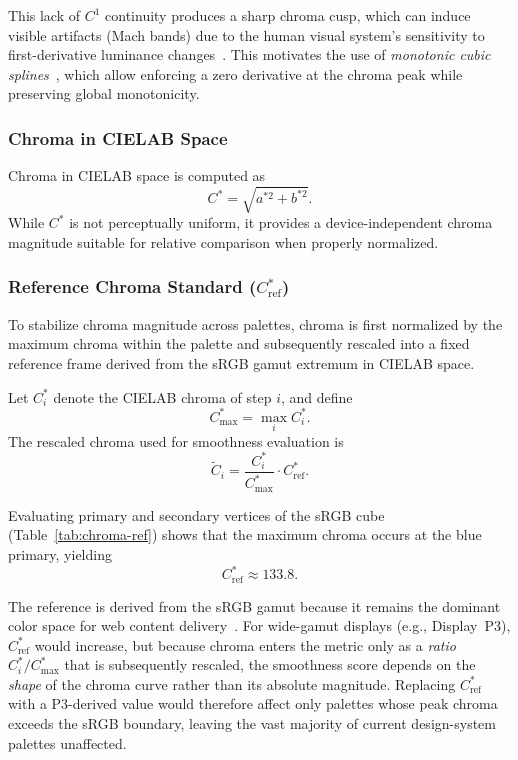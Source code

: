 This lack of $C^1$ continuity produces a sharp chroma cusp, which can induce visible artifacts
(Mach bands) due to the human visual system’s sensitivity to first-derivative luminance changes~\cite{mach1865}.
This motivates the use of \emph{monotonic cubic splines}~\cite{fritsch1980}, which allow enforcing a zero
derivative at the chroma peak while preserving global monotonicity.

\subsubsection{Chroma in CIELAB Space}

Chroma in CIELAB space is computed as
\begin{equation}
C^* = \sqrt{a^{*2} + b^{*2}} .
\end{equation}
While $C^*$ is not perceptually uniform, it provides a device-independent chroma magnitude
suitable for relative comparison when properly normalized.

\subsubsection{Reference Chroma Standard ($C^*_{\mathrm{ref}}$)}

To stabilize chroma magnitude across palettes, chroma is first normalized by the maximum
chroma within the palette and subsequently rescaled into a fixed reference frame derived
from the sRGB gamut extremum in CIELAB space.

Let $C^*_i$ denote the CIELAB chroma of step $i$, and define
\begin{equation}
C^*_{\max} = \max_i C^*_i .
\end{equation}
The rescaled chroma used for smoothness evaluation is
\begin{equation}
\tilde C_i = \frac{C^*_i}{C^*_{\max}} \cdot C^*_{\mathrm{ref}} .
\end{equation}

Evaluating primary and secondary vertices of the sRGB cube (Table~\ref{tab:chroma-ref}) shows that the maximum chroma
occurs at the blue primary, yielding
\begin{equation}
C^*_{\mathrm{ref}} \approx 133.8 .
\end{equation}



\noindent
The reference is derived from the sRGB gamut because it remains the
dominant color space for web content delivery~\cite{srgb}.
For wide-gamut displays (e.g., Display~P3), $C^*_{\mathrm{ref}}$ would
increase, but because chroma enters the metric only as a \emph{ratio}
$C^*_i / C^*_{\max}$ that is subsequently rescaled, the smoothness score
depends on the \emph{shape} of the chroma curve rather than its absolute
magnitude. Replacing $C^*_{\mathrm{ref}}$ with a P3-derived value would
therefore affect only palettes whose peak chroma exceeds the sRGB boundary,
leaving the vast majority of current design-system palettes unaffected.


